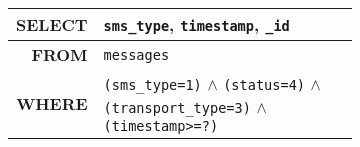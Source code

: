 \begin{figure}
\begin{subfigure}{\columnwidth}
  {\small
    \begin{tabular}{r|p{60mm}}
    \textbf{SELECT} & 
            \textcolor{mid-gray}{{\texttt{sms\_type}}},  \textcolor{mid-gray}{{\texttt{timestamp}}},
         \textcolor{mid-gray}{{\texttt{\_id}}}\\ \hline
    \textbf{FROM} &
        \texttt{{\texttt{messages}}}\\ \hline
    \textbf{WHERE} &
        \texttt{(sms\_type=1)} $\wedge$
        {\texttt{(status=4)}} $\wedge$
         {\texttt{(transport\_type=3)}} $\wedge$
         \textcolor{mid-gray}{{\texttt{(timestamp>=?)}}}
    \end{tabular}
  }
  \label{fig:cluster5}
\end{subfigure}\\[2mm]

\label{fig:visualizepocketdatabyitsnaivemixturesummary}
\trimfigurewhitespace
\end{figure}